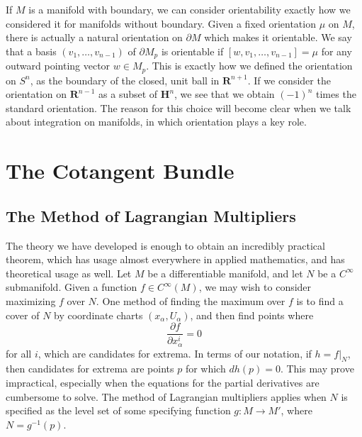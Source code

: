 If $M$ is a manifold with boundary, we can consider orientability exactly how we considered it for manifolds without boundary. Given a fixed orientation $\mu$ on $M$, there is actually a natural orientation on $\partial M$ which makes it orientable. We say that a basis $(v_1, \dots, v_{n-1})$ of $\partial M_p$ is orientable if $[w, v_1, \dots, v_{n-1}] = \mu$ for any outward pointing vector $w \in M_p$. This is exactly how we defined the orientation on $S^n$, as the boundary of the closed, unit ball in $\mathbf{R}^{n+1}$. If we consider the orientation on $\mathbf{R}^{n-1}$ as a subset of $\mathbf{H}^n$, we see that we obtain $(-1)^n$ times the standard orientation. The reason for this choice will become clear when we talk about integration on manifolds, in which orientation plays a key role.

\chapter{The Cotangent Bundle}

\section{The Method of Lagrangian Multipliers}

The theory we have developed is enough to obtain an incredibly practical theorem, which has usage almost everywhere in applied mathematics, and has theoretical usage as well. Let $M$ be a differentiable manifold, and let $N$ be a $C^\infty$ submanifold. Given a function $f \in C^\infty(M)$, we may wish to consider maximizing $f$ over $N$. One method of finding the maximum over $f$ is to find a cover of $N$ by coordinate charts $(x_\alpha,U_\alpha)$, and then find points where
%
\[ \frac{\partial f}{\partial x^i_\alpha} = 0 \]
%
for all $i$, which are candidates for extrema. In terms of our notation, if $h = f|_N$, then candidates for extrema are points $p$ for which $dh(p) = 0$. This may prove impractical, especially when the equations for the partial derivatives are cumbersome to solve. The method of Lagrangian multipliers applies when $N$ is specified as the level set of some specifying function $g: M \to M'$, where $N = g^{-1}(p)$.

